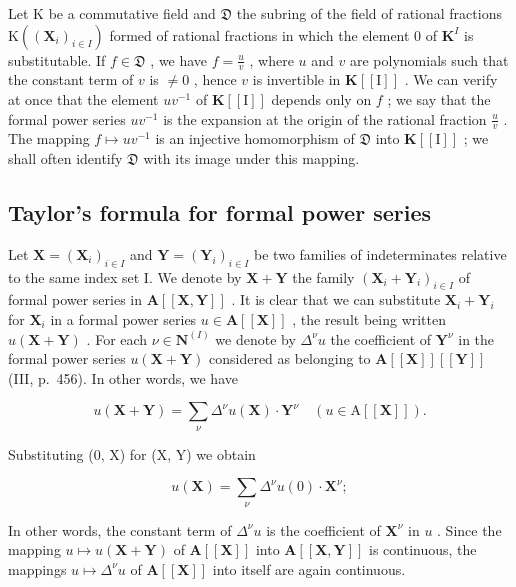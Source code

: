 Let K be a commutative field and \(\mathfrak{D}\) the subring of the field of rational fractions \(\mathrm{K}((\mathbf{X}_i)_{i\in I})\) formed of rational fractions in which the element 0 of \(\mathbf{K}^I\) is substitutable. If \(f\in \mathfrak{D}\) , we have \(f = \frac{u}{v}\) , where \(u\) and \(v\) are polynomials such that the constant term of \(v\) is \(\neq 0\) , hence \(v\) is invertible in \(\mathbf{K}[[\mathrm{I}]]\) . We can verify at once that the element \(uv^{-1}\) of \(\mathbf{K}[[\mathrm{I}]]\) depends only on \(f\) ; we say that the formal power series \(uv^{-1}\) is the expansion at the origin of the rational fraction \(\frac{u}{v}\) . The mapping \(f\mapsto uv^{-1}\) is an injective homomorphism of \(\mathfrak{D}\) into \(\mathbf{K}[[\mathrm{I}]]\) ; we shall often identify \(\mathfrak{D}\) with its image under this mapping.

\subsection{Taylor's formula for formal power series}

Let \(\mathbf{X} = (\mathbf{X}_i)_{i\in I}\) and \(\mathbf{Y} = (\mathbf{Y}_i)_{i\in I}\) be two families of indeterminates relative to the same index set I. We denote by \(\mathbf{X} + \mathbf{Y}\) the family \((\mathbf{X}_i + \mathbf{Y}_i)_{i\in I}\) of formal power series in \(\mathbf{A}[[\mathbf{X},\mathbf{Y}]]\) . It is clear that we can substitute \(\mathbf{X}_i + \mathbf{Y}_i\) for \(\mathbf{X}_i\) in a formal power series \(u\in \mathbf{A}[[\mathbf{X}]]\) , the result being written \(u(\mathbf{X} + \mathbf{Y})\) . For each \(\nu \in \mathbf{N}^{(I)}\) we denote by \(\Delta^{\nu}u\) the coefficient of \(\mathbf{Y}^{\nu}\) in the formal power series \(u(\mathbf{X} + \mathbf{Y})\) considered as belonging to \(\mathbf{A}[[\mathbf{X}]][[\mathbf{Y}]]\) (III, p.~456). In other words, we have

\[
u (\mathbf {X} + \mathbf {Y}) = \sum_ {\nu} \Delta^ {\nu} u (\mathbf {X}) \cdot \mathbf {Y} ^ {\nu} \quad (u \in \mathrm{A} [ [ \mathbf {X} ] ]).\tag{6}
\]

Substituting (0, X) for (X, Y) we obtain

\[
u (\mathbf {X}) = \sum_ {\nu} \Delta^ {\nu} u (0) \cdot \mathbf {X} ^ {\nu};\tag{7}
\]

In other words, the constant term of \(\Delta^{\nu}u\) is the coefficient of \(\mathbf{X}^{\nu}\) in \(u\) . Since the mapping \(u \mapsto u(\mathbf{X} + \mathbf{Y})\) of \(\mathbf{A}[[\mathbf{X}]]\) into \(\mathbf{A}[[\mathbf{X}, \mathbf{Y}]]\) is continuous, the mappings \(u \mapsto \Delta^{\nu}u\) of \(\mathbf{A}[[\mathbf{X}]]\) into itself are again continuous.

